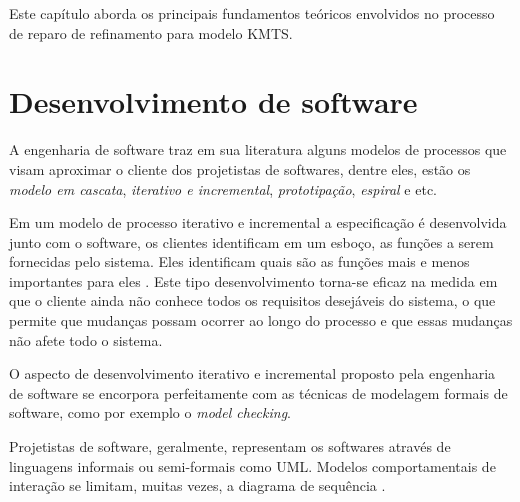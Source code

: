 
Este capítulo aborda os principais fundamentos teóricos envolvidos no processo de reparo de refinamento para modelo KMTS.

\section{Desenvolvimento de software}

A engenharia de software traz em sua literatura alguns modelos de processos que visam aproximar o cliente dos projetistas de softwares, dentre eles, estão os \textit{modelo em cascata}, \textit{iterativo e incremental}, \textit{prototipação}, \textit{espiral} e etc.

Em um modelo de processo iterativo e incremental a especificação é desenvolvida junto com o software, os clientes identificam em um esboço, as funções a serem fornecidas pelo sistema. Eles identificam quais são as funções mais e menos importantes para eles \cite{sommerville2011engenharia}.
Este tipo desenvolvimento torna-se eficaz na medida em que o cliente ainda não conhece todos os requisitos desejáveis do sistema, o que permite que mudanças possam ocorrer ao longo do processo e que essas mudanças não afete todo o sistema.

O aspecto de desenvolvimento iterativo e incremental proposto pela engenharia de software se encorpora perfeitamente com as técnicas de modelagem formais de software, como por exemplo o \textit{model checking}.

Projetistas de software, geralmente, representam os softwares através de linguagens informais ou semi-formais como UML. Modelos comportamentais de interação se limitam, muitas vezes, a diagrama de sequência \cite{uchitel2003synthesis}.

